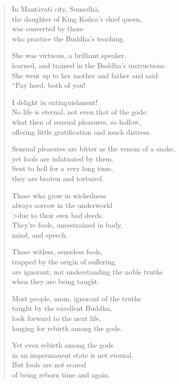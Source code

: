 \documentclass[12pt,openany]{book}%
\begin{document}
\begin{verse}%
In \textsanskrit{Mantāvatī} city, \textsanskrit{Sumedhā}, \\
the daughter of King \textsanskrit{Koñca}’s chief queen, \\
was converted by those \\
who practice the Buddha’s teaching. 

She was virtuous, a brilliant speaker, \\
learned, and trained in the Buddha’s instructions. \\
She went up to her mother and father and said: \\
“Pay heed, both of you! 

I delight in extinguishment! \\
No life is eternal, not even that of the gods; \\
what then of sensual pleasures, so hollow, \\
offering little gratification and much distress. 

Sensual pleasures are bitter as the venom of a snake, \\
yet fools are infatuated by them. \\
Sent to hell for a very long time, \\
they are beaten and tortured. 

Those who grow in wickedness \\
always sorrow in the underworld \\>due to their own bad deeds. \\
They’re fools, unrestrained in body, \\
mind, and speech. 

Those witless, senseless fools, \\
trapped by the origin of suffering, \\
are ignorant, not understanding the noble truths \\
when they are being taught. 

Most people, mum, ignorant of the truths \\
taught by the excellent Buddha, \\
look forward to the next life, \\
longing for rebirth among the gods. 

Yet even rebirth among the gods \\
in an impermanent state is not eternal. \\
But fools are not scared \\
of being reborn time and again. 


\end{verse}
\end{document}
